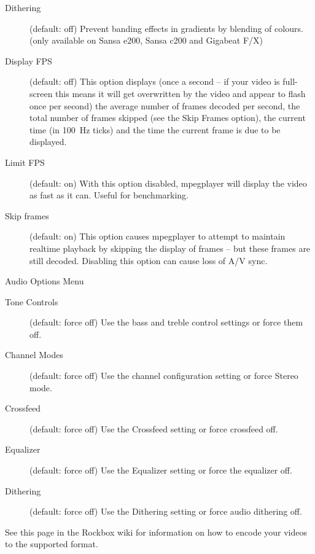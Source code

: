 \begin{description}
\item[Dithering] (default: off) Prevent banding effects in gradients by blending
    of colours. (only available on Sansa e200, Sansa c200 and Gigabeat F/X)
\item[Display FPS] (default: off) This option displays (once a second -- if your
    video is full-screen this means it will get overwritten by the video and
    appear to flash once per second) the average number of frames decoded per
    second, the total number of frames skipped (see the Skip Frames option),
    the current time (in 100~Hz ticks) and the time the current frame is due to
    be displayed.
\item[Limit FPS] (default: on) With this option disabled, mpegplayer will
    display the video as fast as it can. Useful for benchmarking.
\item[Skip frames] (default: on) This option causes mpegplayer to attempt to
    maintain realtime playback by skipping the display of frames -- but these
    frames are still decoded. Disabling this option can cause loss of A/V sync.
\end{description}

Audio Options Menu

\begin{description}
\item[Tone Controls] (default: force off) Use the bass and treble control
    settings or force them off.
\item[Channel Modes] (default: force off) Use the channel configuration setting
    or force Stereo mode.
\item[Crossfeed] (default: force off) Use the Crossfeed setting or force
    crossfeed off.
\item[Equalizer] (default: force off) Use the Equalizer setting or force the
    equalizer off.
\item[Dithering] (default: force off) Use the Dithering setting or force
    audio dithering off.
\end{description}

See this page in the Rockbox wiki for information on how to encode your videos
to the supported format. 
